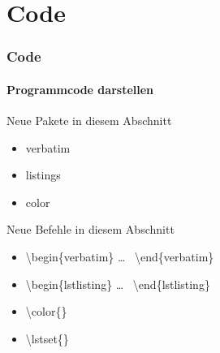 \section{Code}

\begin{frame}
\frametitle{Code}
\framesubtitle{Programmcode darstellen}

\begin{exampleblock}{Neue Pakete in diesem Abschnitt}
\begin{multicols}{3}
\begin{itemize}
\item verbatim
\item listings
\item color
\end{itemize}
\end{multicols}
\end{exampleblock}

\begin{block}{Neue Befehle in diesem Abschnitt}
\begin{itemize}
\item \color{unibablueI}\textbackslash begin\color{black}\{verbatim\} \dots
~\color{unibablueI}\textbackslash end\color{black}\{verbatim\}
\item \color{unibablueI}\textbackslash begin\color{black}\{lstlisting\} \dots
~\color{unibablueI}\textbackslash end\color{black}\{lstlisting\}
\item \color{nounibaredI}\textbackslash color\color{black}\{\}
\item \color{nounibaredI}\textbackslash lstset\color{black}\{\}
\end{itemize}
\end{block}

\end{frame}


